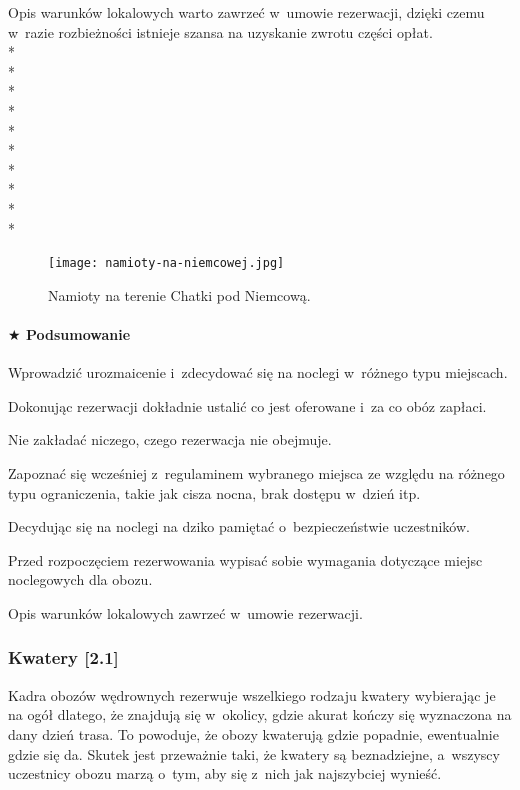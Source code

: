 \documentclass[a5paper,10pt,titlepage,twoside]{article}
\newcommand*{\thecheckbox}{\hss$\Box$} %
\newenvironment*{checklist}
{\list{}{%
\renewcommand*{\makelabel}[1]{\thecheckbox}}}
{\endlist}
\begin{document}
Opis warunków lokalowych warto zawrzeć w~umowie rezerwacji, dzięki czemu w~razie rozbieżności istnieje szansa na uzyskanie zwrotu części opłat.\\*
~\\*
~\\*
~\\*
~\\*
~\\*
~\\*
~\\*
~\\*
~\\*
\begin{figure}[htp]
\centering
\texttt{[image: namioty-na-niemcowej.jpg]}\\
\caption{Namioty na terenie Chatki pod Niemcową.}\label{fig:namioty-na-niemcowej}
\end{figure}

\newpage
\paragraph{$\bigstar$ Podsumowanie}
\begin{checklist}
\item Wprowadzić urozmaicenie i~zdecydować się na noclegi w~różnego typu miejscach.
\item Dokonując rezerwacji dokładnie ustalić co jest oferowane i~za co obóz zapłaci.
\item Nie zakładać niczego, czego rezerwacja nie obejmuje.
\item Zapoznać się wcześniej z~regulaminem wybranego miejsca ze względu na różnego typu ograniczenia, takie jak cisza nocna, brak dostępu w~dzień itp.
\item Decydując się na noclegi na dziko pamiętać o~bezpieczeństwie uczestników.
\item Przed rozpoczęciem rezerwowania wypisać sobie wymagania dotyczące miejsc noclegowych dla obozu.
\item Opis warunków lokalowych zawrzeć w~umowie rezerwacji.
\end{checklist}

\subsubsection{Kwatery [2.1] \label{kwatery}}
Kadra obozów wędrownych rezerwuje wszelkiego rodzaju kwatery wybierając je na ogół dlatego, że znajdują się w~okolicy, gdzie akurat kończy się wyznaczona na dany dzień trasa. To powoduje, że obozy kwaterują gdzie popadnie, ewentualnie gdzie się da. Skutek jest przeważnie taki, że kwatery są beznadziejne, a~wszyscy uczestnicy obozu marzą o~tym, aby się z~nich jak najszybciej wynieść.
\end{document}
